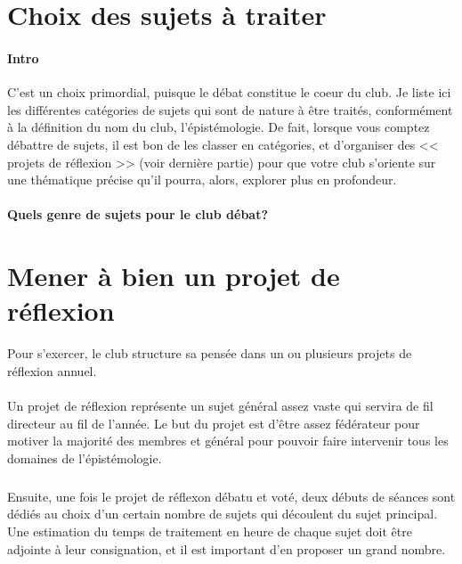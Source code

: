 \documentclass[a4paper,11pt]{article}
\begin{document}
\section{Choix des sujets à traiter}
\paragraph{Intro}
C'est un choix primordial, puisque le débat constitue le coeur du club. Je liste ici les différentes catégories de sujets qui sont de nature à être traités, conformément à la définition du nom du club, l'épistémologie. De fait, lorsque vous comptez débattre de sujets, il est bon de les classer en catégories, et d'organiser des << projets de réflexion >> (voir dernière partie) pour que votre club s'oriente sur une thématique précise qu'il pourra, alors, explorer plus en profondeur.
\paragraph{Quels genre de sujets pour le club débat?}


\section{Mener à bien un projet de réflexion}
Pour s'exercer, le club structure sa pensée dans un ou plusieurs projets de réflexion annuel.

\paragraph{}
Un projet de réflexion représente un sujet général assez vaste qui servira de fil directeur au fil de l'année. Le but du projet est d'être assez fédérateur pour motiver la majorité des membres et général pour pouvoir faire intervenir tous les domaines de l'épistémologie.
\subparagraph{}
Ensuite, une fois le projet de réflexon débatu et voté, deux débuts de séances sont dédiés au choix d'un certain nombre de sujets qui découlent du sujet principal. Une estimation du temps de traitement en heure de chaque sujet doit être adjointe à leur consignation, et il est important d'en proposer un grand nombre.
\end{document}
